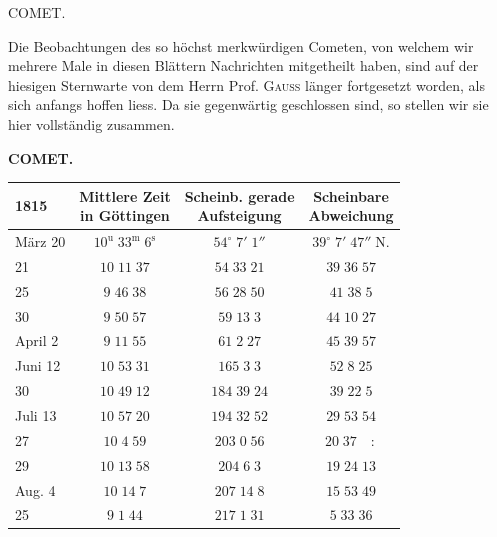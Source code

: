 \par{}\bigskip
\hypertarget{native-394-lower}{}\label{native-394-lower}
\begin{center}
\large COMET.
\end{center}

\par\indent Die Beobachtungen des so höchst merkwürdigen Cometen, von welchem wir mehrere Male in
diesen Blättern Nachrichten mitgetheilt haben, sind auf der hiesigen Sternwarte von dem Herrn Prof.
\textsc{Gauss} länger fortgesetzt worden, als sich anfangs hoffen liess. Da sie gegenwärtig geschlossen sind, so
stellen wir sie hier vollständig zusammen.

\clearpage
\thispagestyle{empty}
\noindent{}%
%
\parbox[t]{\dimexpr\linewidth-24mm\relax}{\centering\footnotesize\bfseries COMET.\par}%
\makebox[12mm][r]{}\par\nobreak\medskip
\begin{center}\fontsize{10}{12}\selectfont\setlength{\tabcolsep}{5pt}\renewcommand{\arraystretch}{1.15}\begin{tabular}{l|c|c|c}
1815 & \shortstack{Mittlere Zeit\\in Göttingen} & \shortstack{Scheinb. gerade\\Aufsteigung} & \shortstack{Scheinbare\\Abweichung}\\\hline
März 20 & $10^{\mathrm u}\;33^{\mathrm m}\;6^{\mathrm s}$ & $54^\circ\;7'\;1''$ & $39^\circ\;7'\;47''\;\mathrm{N.}$\\
21 & $10\;11\;37$ & $54\;33\;21$ & $39\;36\;57$\\
25 & $9\;46\;38$ & $56\;28\;50$ & $41\;38\;5$\\
30 & $9\;50\;57$ & $59\;13\;3$ & $44\;10\;27$\\
April 2 & $9\;11\;55$ & $61\;2\;27$ & $45\;39\;57$\\
Juni 12 & $10\;53\;31$ & $165\;3\;3$ & $52\;8\;25$\\
30 & $10\;49\;12$ & $184\;39\;24$ & $39\;22\;5$\\
Juli 13 & $10\;57\;20$ & $194\;32\;52$ & $29\;53\;54$\\
27 & $10\;4\;59$ & $203\;0\;56$ & $20\;37\quad:$\\
29 & $10\;13\;58$ & $204\;6\;3$ & $19\;24\;13$\\
Aug. 4 & $10\;14\;7$ & $207\;14\;8$ & $15\;53\;49$\\
25 & $9\;1\;44$ & $217\;1\;31$ & $5\;33\;36$\\
\end{tabular}\end{center}

